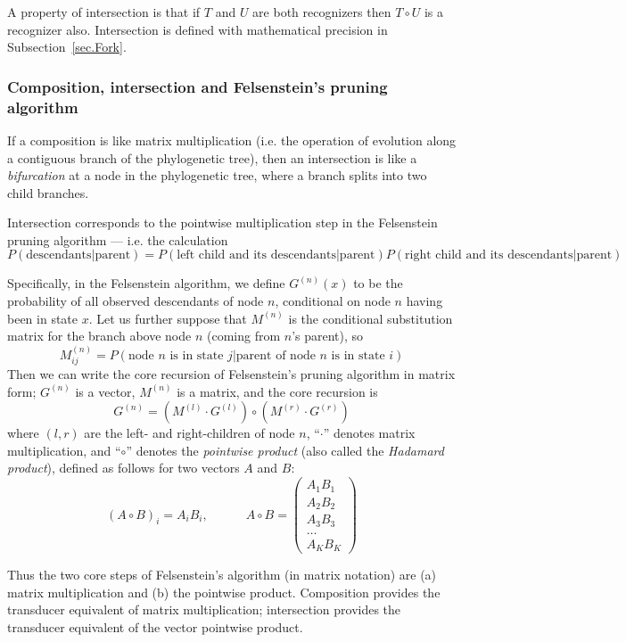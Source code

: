 \documentclass{article}
\newcommand{\secref}[1]{Subsection~\ref{sec.#1}}
\newcommand{\seclabel}[1]{\label{sec.#1}}
\newcommand\fork{\circ}
\begin{document}
A property of intersection is that
if $T$ and $U$ are both recognizers then $T \fork U$ is a recognizer also.
Intersection is defined with mathematical precision in \secref{Fork}. 

\subsubsection{Composition, intersection and Felsenstein's pruning algorithm}
\seclabel{Felsenstein}

If a composition is like matrix multiplication
(i.e. the operation of evolution along a contiguous branch of the phylogenetic tree),
then an intersection is like a {\em bifurcation} at a node in the phylogenetic tree,
where a branch splits into two child branches.

Intersection corresponds to the pointwise multiplication step in the Felsenstein pruning algorithm ---
i.e. the calculation
\[
P(\mbox{descendants}|\mbox{parent}) =
P(\mbox{left child and its descendants}|\mbox{parent})
P(\mbox{right child and its descendants}|\mbox{parent})
\]

Specifically, in the Felsenstein algorithm,
we define $G^{(n)}(x)$ to be the probability of all observed descendants of node $n$,
conditional on node $n$ having been in state $x$.
Let us further suppose that $M^{(n)}$ is the conditional substitution matrix
for the branch above node $n$ (coming from $n$'s parent), so
\[
M^{(n)}_{ij}=P(\mbox{node $n$ is in state $j$}|\mbox{parent of node $n$ is in state $i$})
\]
Then we can write the core recursion of Felsenstein's pruning algorithm in matrix form;
$G^{(n)}$ is a vector, $M^{(n)}$ is a matrix, and the core recursion is
\[
G^{(n)} = \left( M^{(l)} \cdot G^{(l)} \right) \fork \left( M^{(r)} \cdot G^{(r)} \right)
\]
where $(l,r)$ are the left- and right-children of node $n$,
``$\cdot$'' denotes matrix multiplication,
and ``$\fork$'' denotes the {\em pointwise product} (also called the {\em Hadamard product}),
defined as follows for two vectors $A$ and $B$:
\[
(A \fork B)_i = A_i B_i,
\quad \quad \quad
A \fork B = \left( \begin{array}{c}
A_1 B_1 \\ A_2 B_2 \\ A_3 B_3 \\ \ldots \\ A_K B_K
\end{array} \right)
\]

Thus the two core steps of Felsenstein's algorithm (in matrix notation)
are (a) matrix multiplication and (b) the pointwise product.
Composition provides the transducer equivalent of matrix multiplication;
intersection provides the transducer equivalent of the vector pointwise product.
\end{document}
